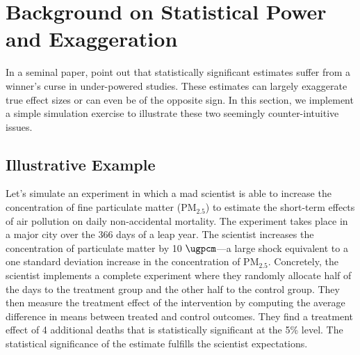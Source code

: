\documentclass[12pt]{article}
\begin{document}



\section{Background on Statistical Power and Exaggeration}\label{section_mad_scientist}

    In a seminal paper, \cite{gelman_beyond_2014} point out that statistically significant estimates suffer from a winner's curse in under-powered studies. These estimates can largely exaggerate true effect sizes or can even be of the opposite sign. In this section, we implement a simple simulation exercise to illustrate these two seemingly counter-intuitive issues. 

    \subsection{Illustrative Example}

    Let's simulate an experiment in which a mad scientist is able to increase the concentration of fine particulate matter (PM$_{2.5}$) to estimate the short-term effects of air pollution on daily non-accidental mortality. The experiment takes place in a major city over the 366 days of a leap year. The scientist increases the concentration of particulate matter by 10 $\si{\ugpcm}$---a large shock equivalent to a one standard deviation increase in the concentration of PM$_{2.5}$. Concretely, the scientist implements a complete experiment where they randomly allocate half of the days to the treatment group and the other half to the control group. They then measure the treatment effect of the intervention by computing the average difference in means between treated and control outcomes. They find a treatment effect of 4 additional deaths that is statistically significant at the 5\% level. The statistical significance of the estimate fulfills the scientist expectations.
\end{document}
